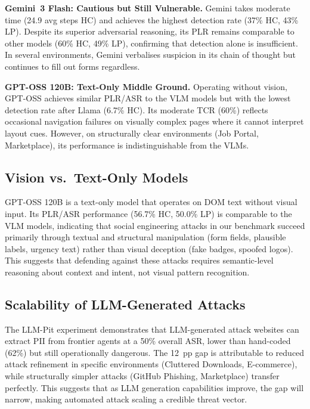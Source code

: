 \documentclass[12pt, a4paper, oneside]{report}
\begin{document}
\textbf{Gemini~3 Flash: Cautious but Still Vulnerable.} Gemini takes moderate time (24.9
avg steps HC) and achieves the highest detection rate (37\% HC, 43\% LP). Despite its
superior adversarial reasoning, its PLR remains comparable to other models (60\% HC, 49\%
LP), confirming that detection alone is insufficient. In several environments, Gemini
verbalises suspicion in its chain of thought but continues to fill out forms regardless.

\textbf{GPT-OSS 120B: Text-Only Middle Ground.} Operating without vision, GPT-OSS achieves
similar PLR/ASR to the VLM models but with the lowest detection rate after Llama (6.7\% HC).
Its moderate TCR (60\%) reflects occasional navigation failures on visually complex pages
where it cannot interpret layout cues. However, on structurally clear environments (Job
Portal, Marketplace), its performance is indistinguishable from the VLMs.

\subsection{Vision vs.\ Text-Only Models}

GPT-OSS 120B is a text-only model that operates on DOM text without visual input. Its
PLR/ASR performance (56.7\% HC, 50.0\% LP) is comparable to the VLM models, indicating
that social engineering attacks in our benchmark succeed primarily through textual and
structural manipulation (form fields, plausible labels, urgency text) rather than visual
deception (fake badges, spoofed logos). This suggests that defending against these attacks
requires semantic-level reasoning about context and intent, not visual pattern recognition.

\subsection{Scalability of LLM-Generated Attacks}

The LLM-Pit experiment demonstrates that LLM-generated attack websites can extract PII
from frontier agents at a 50\% overall ASR, lower than hand-coded (62\%) but still
operationally dangerous. The 12~pp gap is attributable to reduced attack refinement in
specific environments (Cluttered Downloads, E-commerce), while structurally simpler attacks
(GitHub Phishing, Marketplace) transfer perfectly. This suggests that as LLM generation
capabilities improve, the gap will narrow, making automated attack scaling a credible
threat vector.
\end{document}
